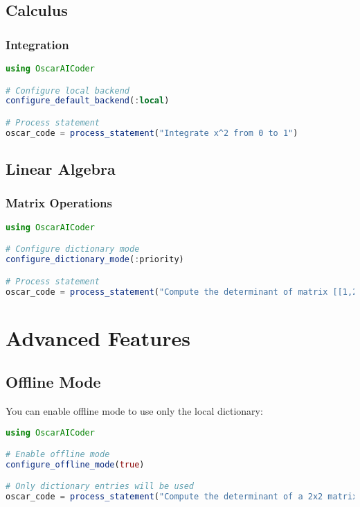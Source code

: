 \documentclass[11pt,a4paper]{article}
\begin{document}
\subsection{Calculus}

\subsubsection{Integration}

\begin{lstlisting}[language=Julia]
using OscarAICoder

# Configure local backend
configure_default_backend(:local)

# Process statement
oscar_code = process_statement("Integrate x^2 from 0 to 1")
\end{lstlisting}

\subsection{Linear Algebra}

\subsubsection{Matrix Operations}

\begin{lstlisting}[language=Julia]
using OscarAICoder

# Configure dictionary mode
configure_dictionary_mode(:priority)

# Process statement
oscar_code = process_statement("Compute the determinant of matrix [[1,2],[3,4]]")
\end{lstlisting}

\section{Advanced Features}

\subsection{Offline Mode}

You can enable offline mode to use only the local dictionary:

\begin{lstlisting}[language=Julia]
using OscarAICoder

# Enable offline mode
configure_offline_mode(true)

# Only dictionary entries will be used
oscar_code = process_statement("Compute the determinant of a 2x2 matrix")
\end{lstlisting}
\end{document}
